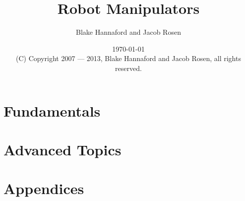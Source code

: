 \documentclass[letterpaper]{book}
\begin{document}
\setpagewiselinenumbers        %
\modulolinenumbers[5]


\frontmatter

\title{Robot Manipulators}

\author{Blake Hannaford and Jacob Rosen}

\date{\today\\(C) Copyright 2007 --- 2013, Blake Hannaford and Jacob Rosen, all rights reserved. }

\maketitle

\tableofcontents

\mainmatter

\linenumbers

 \part{Fundamentals}

%
%
   \part{Advanced Topics}
%
  \part{Appendices}
  \appendix
  

\backmatter
%
\label{LastPage}
\end{document}
